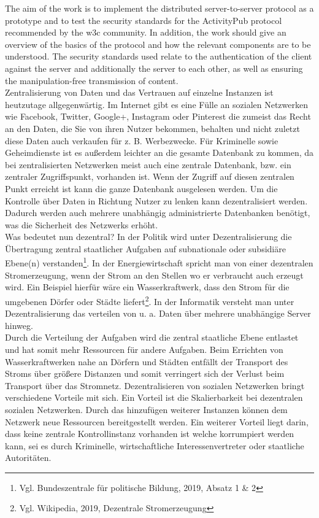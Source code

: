 {	%
	The aim of the work is to implement the distributed server-to-server protocol as a prototype and to test the security standards for the ActivityPub protocol recommended by the \gls{w3c} community. In addition, the work should give an overview of the basics of the protocol and how the relevant components are to be understood. The security standards used relate to the authentication of the client against the server and additionally the server to each other, as well as ensuring the manipulation-free transmission of content.\\

}{
	Zentralisierung von Daten und das Vertrauen auf einzelne Instanzen ist heutzutage allgegenwärtig. Im Internet gibt es eine Fülle an sozialen Netzwerken wie Facebook, Twitter, Google+, Instagram oder Pinterest die zumeist das Recht an den Daten, die Sie von ihren Nutzer bekommen, behalten und nicht zuletzt diese Daten auch verkaufen für z. B. Werbezwecke. Für Kriminelle sowie Geheimdienste ist es außerdem leichter an die gesamte Datenbank zu kommen, da bei zentralisierten Netzwerken meist auch eine zentrale Datenbank, bzw. ein zentraler Zugriffspunkt, vorhanden ist. Wenn der Zugriff auf diesen zentralen Punkt erreicht ist kann die ganze Datenbank ausgelesen werden. Um die Kontrolle über Daten in Richtung Nutzer zu lenken kann dezentralisiert werden. Dadurch werden auch mehrere unabhängig administrierte Datenbanken benötigt, was die Sicherheit des Netzwerks erhöht.\\
	
	Was bedeutet nun dezentral? In der Politik wird unter Dezentralisierung \glqq die Übertragung zentral staatlicher Aufgaben auf subnationale oder subsidiäre Ebene(n) verstanden\grqq\footnote{Vgl. Bundeszentrale für politische Bildung, 2019, Absatz 1 \& 2}. In der Energiewirtschaft spricht man von einer \glqq dezentralen Stromerzeugung\grqq, wenn der Strom an den Stellen wo er verbraucht auch erzeugt wird. Ein Beispiel hierfür wäre ein Wasserkraftwerk, dass den Strom für die umgebenen Dörfer oder Städte liefert\footnote{Vgl. Wikipedia, 2019, Dezentrale Stromerzeugung}. In der Informatik versteht man unter Dezentralisierung das verteilen von u. a. Daten über mehrere unabhängige Server hinweg.\\
	
	Durch die Verteilung der Aufgaben wird die zentral staatliche Ebene entlastet und hat somit mehr Ressourcen für andere Aufgaben. Beim Errichten von Wasserkraftwerken nahe an Dörfern und Städten entfällt der Transport des Stroms über größere Distanzen und somit verringert sich der Verlust beim Transport über das Stromnetz. Dezentralisieren von sozialen Netzwerken bringt verschiedene Vorteile mit sich. Ein Vorteil ist die Skalierbarkeit bei dezentralen sozialen Netzwerken. Durch das hinzufügen weiterer Instanzen können dem Netzwerk neue Ressourcen bereitgestellt werden. Ein weiterer Vorteil liegt darin, dass keine zentrale Kontrollinstanz vorhanden ist welche korrumpiert werden kann, sei es durch Kriminelle, wirtschaftliche Interessenvertreter oder staatliche Autoritäten.\\
	
}
